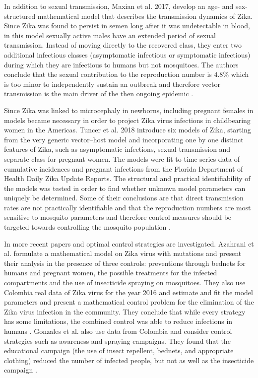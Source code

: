 \documentclass{ws-rv9x6}
\begin{document}
In addition to sexual transmission, Maxian et al. 2017, develop an age- and sex-structured mathematical model that describes the transmission dynamics of Zika. Since Zika was found to persist in semen long after it was undetectable in blood, in this model sexually active males have an extended period of sexual transmission. Instead of moving directly to the recovered class, they enter two additional infectious classes (asymptomatic infectious or symptomatic infectious) during which they are infectious to humans but not mosquitoes. The authors conclude that the sexual contribution to the reproduction number is  $4.8\%$  which is too minor to independently sustain an outbreak and therefore vector transmission is the main driver of the then ongoing epidemic \cite{maxian2017zika}.

Since Zika was linked to microcephaly in newborns, including pregnant females in models became necessary in order to project Zika virus infections in childbearing women in the
Americas. Tuncer et al. 2018 introduce six models of Zika, starting from the very generic vector–host
model and incorporating one by one distinct features of Zika, such as asymptomatic
infections, sexual transmission and separate class for pregnant women. The
models were fit to time-series data of cumulative incidences and pregnant infections from the Florida Department of Health Daily Zika Update Reports. The structural and practical identifiability of the
models was tested in order to find whether unknown model parameters can uniquely be determined. Some of their conclusions are that direct transmission
rates are not practically identifiable and that the reproduction numbers are most sensitive to mosquito parameters and therefore control measures should be targeted towards controlling the mosquito population \cite{tuncer2018structural}.

In more recent papers \cite{alzahrani93optimal} and \cite{gonzalez2020optimization} optimal control strategies are investigated. Azahrani et al. formulate a mathematical model on Zika virus with mutations and present their analysis in the presence of three controls: preventions through bednets for humans and pregnant women, the possible treatments for the infected compartments and the use of insecticide spraying on mosquitoes. They also use Colombia real data of Zika virus for the year 2016 and estimate and fit the model parameters and present a mathematical control problem for the elimination of the Zika virus infection in the community. They conclude that while every strategy has some limitations, the combined control was able to reduce infections in humans \cite{alzahrani93optimal}. Gonzales et al. also use data from Colombia and consider control strategies such as awareness and spraying campaigns. They found
that the educational campaign (the use of insect repellent, bednets, and appropriate clothing) reduced
the number of infected people, but not as well as the insecticide campaign \cite{gonzalez2020optimization}. 
\end{document}
